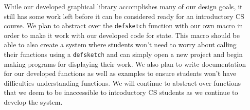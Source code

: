 \documentclass[12pt]{article}
\newcommand{\comment}[1]{{\bf \tt  {#1}}}
\newcommand{\emcomment}[1]{\textcolor{ForestGreen}{\comment{Elena: {#1}}}}
\begin{document}
While our developed graphical library accomplishes many of our design goals, it still has some work left before it can be considered ready for an introductory CS course. We plan to abstract over the \texttt{defsketch} function with our own macro in order to make it work with our developed code for state. This macro should be able to also create a system where students won't need to worry about calling their functions using a \texttt{defsketch} and can simply open a new project and begin making programs for displaying their work. We also plan to write documentation for our developed functions as well as examples to ensure students won't have difficulties understanding functions. We will continue to abstract over functions that we deem to be inaccessible to introductory CS students as we continue to develop the system. %


%
%

%  
%
%




\end{document}
